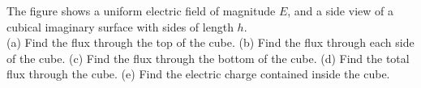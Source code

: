 The figure shows a uniform electric field of magnitude $E$, and a side view of a cubical imaginary surface with
sides of length $h$.\\
(a) Find the flux through the top of the cube.\answercheck\hwendpart
(b) Find the flux through each side of the cube.\answercheck\hwendpart
(c) Find the flux through the bottom of the cube.\answercheck\hwendpart
(d) Find the total flux through the cube.\answercheck\hwendpart
(e) Find the electric charge contained inside the cube.\answercheck\hwendpart
